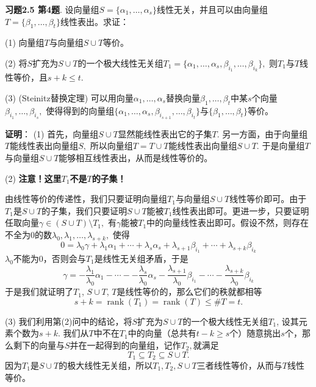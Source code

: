 \fi  %

\newpageorvspace

{\bf 习题2.5 第4题}. 设向量组$S = \{ \alpha_1, \ldots, \alpha_s \}$线性无关，并且可以由向量组$T = \{ \beta_1, \ldots, \beta_t \}$线性表出。求证：

(1) 向量组$T$与向量组$S \cup T$等价。

(2) 将$S$扩充为$S \cup T$的一个极大线性无关组$T_1 = \{ \alpha_1, \ldots, \alpha_s, \beta_{i_1}, \ldots, \beta_{i_k} \},$ 则$T_1$与$T$线性等价，且$s+k \leqslant t.$

(3) (Steinitz替换定理) 可以用向量$\alpha_1, \ldots, \alpha_s$替换向量$\beta_1, \ldots, \beta_t$中某$s$个向量$\beta_{i_1}, \ldots, \beta_{i_s},$ 使得得到的向量组$\{ \alpha_1, \ldots, \alpha_s, \beta_{i_{s+1}}, \ldots, \beta_{i_t} \}$与$\{ \beta_1, \ldots, \beta_t \}$等价。

\ifIncludeAnswer

\newpageorvspace

{\bf 证明}： (1) 首先，向量组$S\cup T$显然能线性表出它的子集$T$. 另一方面，由于向量组$T$能线性表出向量组$S,$ 所以向量组$T = T\cup T$能线性表出向量组$S\cup T.$ 于是向量组$T$与向量组$S \cup T$能够相互线性表出，从而是线性等价的。

(2) \textbf{\color{red}注意！这里$T_1$不是$T$的子集！}

由线性等价的传递性，我们只要证明向量组$T_1$与向量组$S \cup T$线性等价即可。由于$T_1$是$S \cup T$的子集，我们只要证明$S \cup T$能被$T_1$线性表出即可。更进一步，只要证明任取向量$\gamma \in (S \cup T) \setminus T_1,$ 有$\gamma$能被$T_1$中的向量线性表出即可。假设不然，则存在不全为0的数$\lambda_0, \lambda_1, \ldots, \lambda_{s+k},$ 使得
$$0 = \lambda_0 \gamma + \lambda_1 \alpha_1 + \cdots + \lambda_s \alpha_s + \lambda_{s+1} \beta_{i_1} + \cdots + \lambda_{s+k} \beta_{i_k}$$
$\lambda_0$不能为0，否则会与$T_1$是线性无关组矛盾，于是
$$\gamma = -\dfrac{\lambda_1}{\lambda_0} \alpha_1 - \cdots - -\dfrac{\lambda_s}{\lambda_0} \alpha_s - \dfrac{\lambda_{s+1}}{\lambda_0} \beta_{i_1} - \cdots - \dfrac{\lambda_{s+k}}{\lambda_0} \beta_{i_k}$$
于是我们就证明了$T_1$, $S \cup T$, $T$是线性等价的，那么它们的秩就都相等
$$s+k = \operatorname{rank}(T_1) = \operatorname{rank}(T) \leqslant \# T = t.$$

(3) 我们利用第(2)问中的结论，将$S$扩充为$S \cup T$的一个极大线性无关组$T_1$, 设其元素个数为$s+k.$ 我们从$T$中不在$T_1$中的向量（总共有$t - k \geqslant s$个）随意挑出$s$个，那么剩下的向量与$S$并在一起得到的向量组，记作$T_2,$就满足
$$T_1 \subseteq T_2 \subseteq S \cup T.$$
因为$T_1$是$S \cup T$的极大线性无关组，所以$T_1, T_2, S \cup T$三者线性等价，从而与$T$线性等价。

\fi  %



